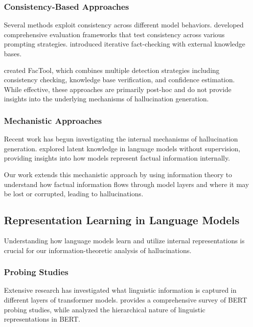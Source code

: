 \subsubsection{Consistency-Based Approaches}
Several methods exploit consistency across different model behaviors. \citet{li2023halueval} developed comprehensive evaluation frameworks that test consistency across various prompting strategies. \citet{peng2023check} introduced iterative fact-checking with external knowledge bases.

\citet{chern2023factool} created FacTool, which combines multiple detection strategies including consistency checking, knowledge base verification, and confidence estimation. While effective, these approaches are primarily post-hoc and do not provide insights into the underlying mechanisms of hallucination generation.

\subsubsection{Mechanistic Approaches}
Recent work has begun investigating the internal mechanisms of hallucination generation. \citet{burns2023discovering} explored latent knowledge in language models without supervision, providing insights into how models represent factual information internally.

Our work extends this mechanistic approach by using information theory to understand how factual information flows through model layers and where it may be lost or corrupted, leading to hallucinations.

\subsection{Representation Learning in Language Models}
\label{subsec:repr_learning_lm}

Understanding how language models learn and utilize internal representations is crucial for our information-theoretic analysis of hallucinations.

\subsubsection{Probing Studies}
Extensive research has investigated what linguistic information is captured in different layers of transformer models. \citet{rogers2020primer} provides a comprehensive survey of BERT probing studies, while \citet{tenney2019bert} analyzed the hierarchical nature of linguistic representations in BERT.

